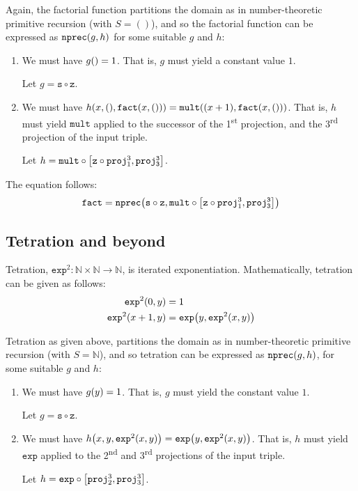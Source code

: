 Again, the factorial function partitions the domain as in number-theoretic
primitive recursion (with $S = ()$), and so the factorial function can be expressed as
$\mathtt{nprec}{\mathopen{}\left({g,h}\right)\mathclose{}}$ for some suitable $g$ and $h$:

\begin{enumerate}[label=(\arabic*)]

\item We must have $g{\mathopen{}\left({}\right)\mathclose{}} = 1$. That is, $g$ must yield a constant value $1$.

Let $g = \mathtt{s} \circ \mathtt{z}$.

\item We must have $h{\mathopen{}\left({x,(),\mathtt{fact}{\mathopen{}\left({x,()}\right)\mathclose{}}}\right)\mathclose{}} = \mathtt{mult}{\mathopen{}\left({{\mathopen{}\left({x+1}\right)\mathclose{}},
\mathtt{fact}{\mathopen{}\left({x,()}\right)\mathclose{}}}\right)\mathclose{}}$. That is, $h$ must yield $\mathtt{mult}$ applied to the
successor of the 1\textsuperscript{st} projection, and the
3\textsuperscript{rd} projection of the input triple.

Let $h = \mathtt{mult} \circ \mathopen{}\left[{\mathtt{z} \circ \mathtt{proj}^3_1,
\mathtt{proj^3_3}}\right]\mathclose{}$.

\end{enumerate}

The equation follows:\begin{align*}
%
\mathtt{fact} = \mathtt{nprec}\p{\mathtt{s} \circ \mathtt{z},
\mathtt{mult} \circ \seq{\mathtt{z} \circ \mathtt{proj}^3_1, \mathtt{proj^3_3}}}
%
\end{align*}

\subsection{Tetration and beyond}

Tetration, $\mathtt{exp}^2 : \mathbb{N} \times \mathbb{N} \rightarrow
\mathbb{N}$, is iterated exponentiation. Mathematically, tetration can be given
as follows:\begin{align*}
%
\mathtt{exp}^2\p{0,y} &= 1 \\
%
\mathtt{exp}^2\p{x+1, y} &= \mathtt{exp}\p{y,\mathtt{exp}^2\p{x,y}}
%
\end{align*}

Tetration as given above, partitions the domain as in number-theoretic
primitive recursion (with $S = \mathbb{N}$), and so tetration can be expressed
as $\mathtt{nprec}{\mathopen{}\left({g,h}\right)\mathclose{}}$, for some suitable $g$ and $h$:

\begin{enumerate}[label=(\arabic*)]

\item We must have $g{\mathopen{}\left({y}\right)\mathclose{}} = 1$. That is, $g$ must yield the constant value $1$.

Let $g = \mathtt{s} \circ \mathtt{z}$.

\item We must have $h{\mathopen{}\left({x,y,\mathtt{exp}^2{\mathopen{}\left({x,y}\right)\mathclose{}}}\right)\mathclose{}} = \mathtt{exp}{\mathopen{}\left({y,
\mathtt{exp}^2{\mathopen{}\left({x,y}\right)\mathclose{}}}\right)\mathclose{}}$. That is, $h$ must yield $\mathtt{exp}$ applied to the
2\textsuperscript{nd} and 3\textsuperscript{rd} projections of the input
triple.

Let $h = \mathtt{exp} \circ \mathopen{}\left[{\mathtt{proj}^3_2,\mathtt{proj}^3_3}\right]\mathclose{}$.

\end{enumerate}

